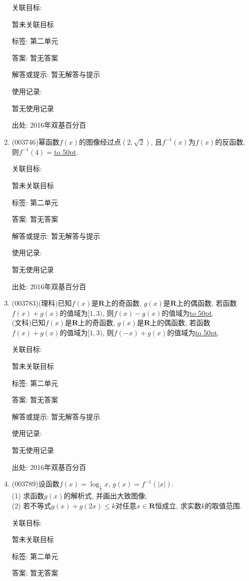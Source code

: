 \documentclass[10pt,a4paper]{article}
\newcommand{\blank}[1]{\underline{\hbox to #1pt{}}}
\begin{document}
\begin{enumerate}[1.]
关联目标:

暂未关联目标



标签: 第二单元

答案: 暂无答案

解答或提示: 暂无解答与提示

使用记录:

暂无使用记录


出处: 2016年双基百分百
\item { (003746)}幂函数$f(x)$的图像经过点$(2,\sqrt{2})$, 且$f^{-1}(x)$为$f(x)$的反函数, 则$f^{-1}(4)=$\blank{50}.


关联目标:

暂未关联目标



标签: 第二单元

答案: 暂无答案

解答或提示: 暂无解答与提示

使用记录:

暂无使用记录


出处: 2016年双基百分百
\item { (003783)}(理科)已知$f(x)$是$\mathbf{R}$上的奇函数, $g(x)$是$\mathbf{R}$上的偶函数, 若函数$f(x)+g(x)$的值域为$[1,3)$, 则$f(x)-g(x)$的值域为\blank{50}.\\
(文科)已知$f(x)$是$\mathbf{R}$上的奇函数, $g(x)$是$\mathbf{R}$上的偶函数, 若函数$f(x)+g(x)$的值域为$[1,3)$, 则$f(-x)+g(x)$的值域为\blank{50}.


关联目标:

暂未关联目标



标签: 第二单元

答案: 暂无答案

解答或提示: 暂无解答与提示

使用记录:

暂无使用记录


出处: 2016年双基百分百
\item { (003789)}设函数$f(x)=\log_\frac 12 x$, $g(x)=f^{-1}(|x|)$.\\
(1) 求函数$g(x)$的解析式, 并画出大致图像;\\
(2) 若不等式$g(x)+g(2x)\le k$对任意$x\in \mathbf{R}$恒成立, 求实数$k$的取值范围.


关联目标:

暂未关联目标



标签: 第二单元

答案: 暂无答案


\end{enumerate}
\end{document}

